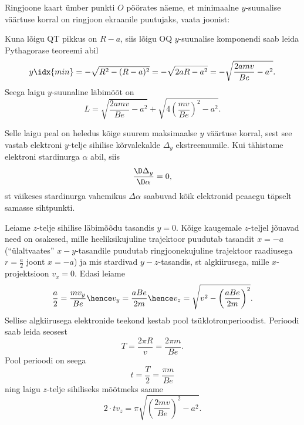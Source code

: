 \documentclass[11pt, twoside]{article}
\begin{document}
{{Ringjoone kaart ümber punkti $O$ pöörates näeme, et minimaalne $y$-suunalise väärtuse korral on ringjoon ekraanile puutujaks, vaata joonist:
\begin{center}
\end{center}
Kuna lõigu QT pikkus on $R-a$, siis lõigu OQ $y$-suunalise komponendi saab leida Pythagorase teoreemi abil
$$y\idx{min}=-\sqrt{R^2-(R-a)^2} = -\sqrt{2aR-a^2}=-\sqrt{\frac{2amv}{Be}-a^2}.$$
Seega laigu $y$-suunaline läbimõõt on
$$L=\sqrt{\frac{2amv}{Be}-a^2} + \sqrt{4\left(\frac{mv}{Be}\right)^2-a^2}.$$

Selle laigu peal on heledus kõige suurem maksimaalse $y$ väärtuse korral, sest see vastab elektroni $y$-telje sihilise kõrvalekalde $\Delta_y$ ekstreemumile. 
Kui tähistame elektroni stardinurga $\alpha$ abil, siis 
$$\frac{\D \Delta_y}{\D \alpha}=0,$$
st väikeses stardinurga vahemikus $\Delta\alpha$ saabuvad kõik elektronid peaaegu täpselt samasse sihtpunkti.

Leiame $z$-telje sihilise läbimõõdu tasandis $y=0$. Kõige kaugemale $z$-teljel jõuavad need on osakesed, mille 
heeliksikujuline trajektoor puudutab tasandit $x=-a$ (``ülaltvaates'' $x-y$-tasandile puudutab ringjoonekujuline trajektoor raadiusega $r=\frac a2$ 
joont $x=-a$) ja mis stardivad $y-z$-tasandis, st algkiirusega, mille $x$-projektsioon $v_x=0$.
Edasi leiame $$\frac a2=\frac {mv_y}{Be}\hence v_y=\frac{aBe}{2m}\hence v_z=\sqrt{v^2-\left(\frac{aBe}{2m}\right)^2}.$$
Sellise algkiirusega elektronide teekond kestab pool tsüklotronperioodist. Perioodi saab leida seosest
\[
T=\frac{2\pi R}{v} = \frac{2\pi m}{Be}.
\]
Pool perioodi on seega
\[
t=\frac{T}{2}=\frac{\pi m}{Be}
\]
ning laigu $z$-telje sihiliseks 
mõõtmeks saame
$$2\cdot tv_z=\pi\sqrt{\left(\frac{2mv}{Be}\right)^2-a^2}.$$
\fi
}

}
\end{document}
